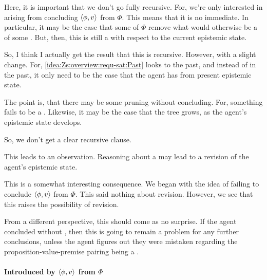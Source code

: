 \begin{note}[Recursion]
   {
    \color{red}
    Here, it is important that we don't go fully recursive.
    For, we're only interested in  arising from concluding \(\langle \phi, v \rangle\) from \(\Phi\).
    This means that it is no immediate.
    In particular, it may be the case that some of \(\Phi\) remove what would otherwise be a \requ{} of some \requ{}.
    But, then, this is still a \requ{} with respect to the current epistemic state.

    So, I think I actually get the result that this is recursive.
    However, with a slight change.
    For, \ref{idea:Zs:overview:requ-sat:Past} looks to the past, and instead of \csVImp{} in the past, it only need to be the case that the agent has \csVed{} from present epistemic state.

    The point is, that there may be some pruning without concluding.
    For, something fails to be a \requ{}.
    Likewise, it may be the case that the tree grows, as the agent's epistemic state develops.

    So, we don't get a clear recursive clause.

    This leads to an observation.
    Reasoning about a \requ{} may lead to a revision of the agent's epistemic state.

    This is a somewhat interesting consequence.
    We began with the idea of failing to conclude \(\langle \phi, v \rangle\) from \(\Phi\).
    This said nothing about revision.
    However, we see that this raises the possibility of revision.

    From a different perspective, this should come as no surprise.
    If the agent concluded without \csN{}, then this is going to remain a problem for any further conclusions, unless the agent figures out they were mistaken regarding the proposition-value-premise pairing being a \requ{}.
  }
\end{note}

\paragraph*{Introduced by \(\langle \phi, v \rangle\) from \(\Phi\)}

